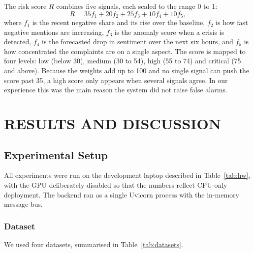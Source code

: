 \documentclass[12pt,a4paper]{report}
\newcommand{\be}{\begin{equation}}
\newcommand{\ee}{\end{equation}}
\begin{document}
The risk score $R$ combines five signals, each scaled to the range 0 to 1:
\be
R = 35 f_1 + 20 f_2 + 25 f_3 + 10 f_4 + 10 f_5,
\ee
where $f_1$ is the recent negative share and its rise over the baseline, $f_2$ is how fast negative mentions are increasing, $f_3$ is the anomaly score when a crisis is detected, $f_4$ is the forecasted drop in sentiment over the next six hours, and $f_5$ is how concentrated the complaints are on a single aspect. The score is mapped to four levels: low (below 30), medium (30 to 54), high (55 to 74) and critical (75 and above). Because the weights add up to 100 and no single signal can push the score past 35, a high score only appears when several signals agree. In our experience this was the main reason the system did not raise false alarms.

\chapter{RESULTS AND DISCUSSION}

\section{Experimental Setup}

All experiments were run on the development laptop described in Table~\ref{tab:hw}, with the GPU deliberately disabled so that the numbers reflect CPU-only deployment. The backend ran as a single Uvicorn process with the in-memory message bus.

\subsection{Dataset}

We used four datasets, summarised in Table~\ref{tab:datasets}.
\end{document}

